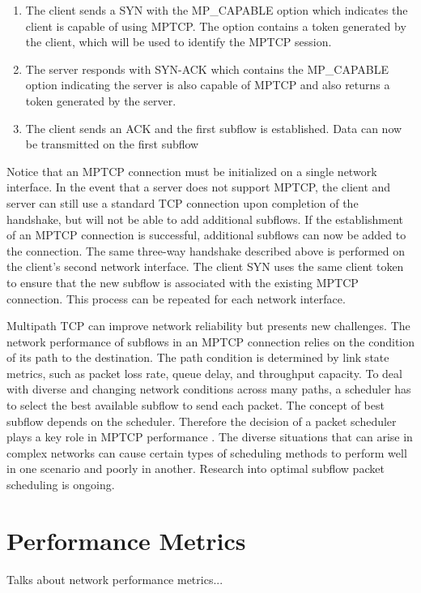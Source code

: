 \documentclass[sigplan,screen,nonacm]{acmart}
\begin{document}
\begin{enumerate}
  \item The client sends a SYN with the MP\_CAPABLE option which indicates the client is capable of using MPTCP. The option contains a token generated by the client, which will be used to identify the MPTCP session.
  \item The server responds with SYN-ACK which contains the MP\_CAPABLE option indicating the server is also capable of MPTCP and also returns a token generated by the server.
  \item The client sends an ACK and the first subflow is established. Data can now be transmitted on the first subflow
\end{enumerate}

Notice that an MPTCP connection must be initialized on a single network interface. In the event that a server does not support MPTCP, the client and server can still use a standard TCP connection upon completion of the handshake, but will not be able to add additional subflows. If the establishment of an MPTCP connection is successful, additional subflows can now be added to the connection. The same three-way handshake described above is performed on the client’s second network interface. The client SYN uses the same client token to ensure that the new subflow is associated with the existing MPTCP connection. This process can be repeated for each network interface.

Multipath TCP can improve network reliability but presents new challenges. The network performance of subflows in an MPTCP connection relies on the condition of its path to the destination. The path condition is determined by link state metrics, such as packet loss rate, queue delay, and throughput capacity. To deal with diverse and changing network conditions across many paths, a scheduler has to select the best available subflow to send each packet. The concept of best subflow depends on the scheduler. Therefore the decision of a packet scheduler plays a key role in MPTCP performance \cite{PacketSchedulingServe:2018}. The diverse situations that can arise in complex networks can cause certain types of scheduling methods to perform well in one scenario and poorly in another. Research into optimal subflow packet scheduling is ongoing.


\section{Performance Metrics}
\label{sec:metrics}
Talks about network performance metrics...
\end{document}
